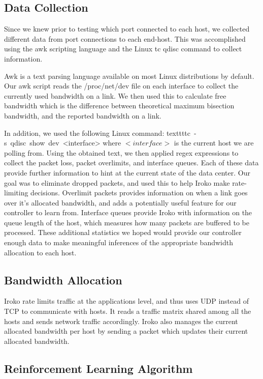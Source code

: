 \subsection{Data Collection }
Since we knew prior to testing which port connected to each host, we collected different data from port connections to each end-host. This was accomplished using the awk scripting language and the Linux tc qdisc command to collect information.

Awk is a text parsing language available on most Linux distributions by default. Our awk script reads the /proc/net/dev file on each interface to collect the currently used  bandwidth on a link. We then used this to calculate free bandwidth which is the difference between theoretical maximum bisection bandwidth, and the reported bandwidth on a link.

In addition, we used the following Linux command:
texttt{tc\ -s\ qdisc\ show\ dev\ <interface>}
where $<interface>$ is the current host we are polling from. Using the obtained text, we then applied regex expressions to collect the packet loss, packet overlimits, and interface queues. Each of these data provide further information to hint at the current state of the data center. Our goal was to eliminate dropped packets, and used this to help Iroko make rate-limiting decisions. Overlimit packets provides information on when a link goes over it’s allocated bandwidth, and adds a potentially useful feature for our controller to learn from. Interface queues provide Iroko with information on the queue length of the host, which measures how many packets are buffered to be processed.  These additional statistics we hoped would provide our controller enough data to make meaningful inferences of the appropriate bandwidth allocation to each host. 

\subsection{Bandwidth Allocation}
Iroko rate limits traffic at the applications level, and thus uses UDP instead of TCP to communicate with hosts. It reads a traffic matrix shared among all the hosts and sends network traffic accordingly. Iroko also manages the current allocated bandwidth per host by sending a packet which updates their current allocated bandwidth.


\subsection{Reinforcement Learning Algorithm}

